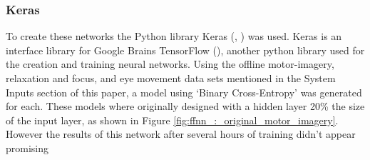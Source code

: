 \documentclass[11pt, a4paper]{article}
\newcommand{\ccite}[1]{(\citeauthor{#1}, \citeyear{#1})}
\newcommand{\cciteyear}[1]{(\citeyear{#1})}
\newcommand{\reffigure}[1]{Figure \ref{#1}}
\begin{document}
\subsubsection{Keras}	 
To create these networks the Python library Keras \ccite{keras} was used. Keras is an interface library for Google Brains TensorFlow \cciteyear{tensorflow}, another python library used for the creation and training neural networks. Using the offline motor-imagery, relaxation and focus, and eye movement data sets mentioned in the System Inputs section of this paper, a model using `Binary Cross-Entropy' was generated for each. These models where originally designed with a hidden layer 20\% the size of the input layer, as shown in \reffigure{fig:ffnn_:_original_motor_imagery}. However the results of this network after several hours of training didn't appear promising
\end{document}
